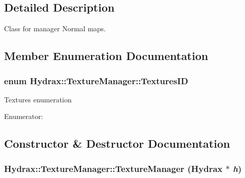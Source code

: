\begin{CompactItemize}
\subsection{Detailed Description}
Class for manager Normal maps. 

\subsection{Member Enumeration Documentation}
\hypertarget{class_hydrax_1_1_texture_manager_9af2a9718c00e64eb188c3dd9cd0fd04}{
\subsubsection[{TexturesID}]{\setlength{\rightskip}{0pt plus 5cm}enum {\bf Hydrax::TextureManager::TexturesID}}}
\label{class_hydrax_1_1_texture_manager_9af2a9718c00e64eb188c3dd9cd0fd04}


Textures enumeration \begin{Desc}
\item[Enumerator: ]\par
\begin{description}
\item[{\em 
\hypertarget{class_hydrax_1_1_texture_manager_9af2a9718c00e64eb188c3dd9cd0fd04f04e9f7557359214c8000825a6b75922}{
TEX\_\-NORMAL\_\-ID}
\label{class_hydrax_1_1_texture_manager_9af2a9718c00e64eb188c3dd9cd0fd04f04e9f7557359214c8000825a6b75922}
}]\end{description}
\end{Desc}



\subsection{Constructor \& Destructor Documentation}
\hypertarget{class_hydrax_1_1_texture_manager_bad81d53663c93a5d2d9bd49eff0ef90}{
\subsubsection[{TextureManager}]{\setlength{\rightskip}{0pt plus 5cm}Hydrax::TextureManager::TextureManager ({\bf Hydrax} $\ast$ {\em h})}}
\label{class_hydrax_1_1_texture_manager_bad81d53663c93a5d2d9bd49eff0ef90}



\end{CompactItemize}
